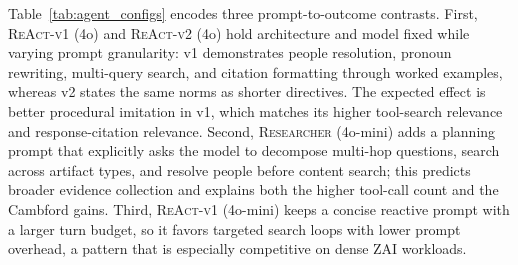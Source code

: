 \begin{table}[H]
\centering
\caption{Configuration summary for the \textcolor{blue}{four} evaluated runtime configurations.
``Planning model'' refers to the LLM used for the optional pre-execution planning step; for \textsc{Researcher} (4o-mini), the same model is used for both planning and execution.
Prompt size is the approximate system-prompt token count. Avg.\ tool calls is the empirical mean across all evaluation cases.}
\label{tab:agent_configs}
\small
{}
\end{table}

Table~\ref{tab:agent_configs} encodes three prompt-to-outcome contrasts. First,
\textsc{ReAct-v1} (4o) and \textsc{ReAct-v2} (4o) hold architecture and model
fixed while varying prompt granularity: v1 demonstrates people resolution,
pronoun rewriting, multi-query search, and citation formatting through worked
examples, whereas v2 states the same norms as shorter directives. The expected
effect is better procedural imitation in v1, which matches its higher
tool-search relevance and response-citation relevance. Second,
\textsc{Researcher} (4o-mini) adds a planning prompt that explicitly asks the
model to decompose multi-hop questions, search across artifact types, and
resolve people before content search; this predicts broader evidence collection
and explains both the higher tool-call count and the Cambford gains. Third,
\textsc{ReAct-v1} (4o-mini) keeps a concise reactive prompt with a larger turn
budget, so it favors targeted search loops with lower prompt overhead, a pattern
that is especially competitive on dense ZAI workloads.

